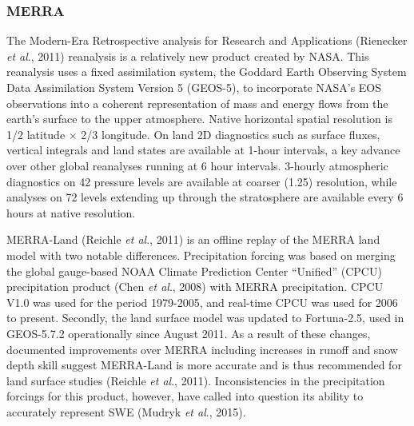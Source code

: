 \documentclass[12pt]{article}
\begin{document}
\subsubsection{MERRA}
The Modern-Era Retrospective analysis for Research and Applications (Rienecker \textit{et al}., 2011) reanalysis is a relatively new product created by NASA.  This reanalysis uses a fixed assimilation system, the Goddard Earth Observing System Data Assimilation System Version 5 (GEOS-5), to incorporate NASA's EOS observations into a coherent representation of mass and energy flows from the earth's surface to the upper atmosphere.  Native horizontal spatial resolution is 1/2\textdegree{} latitude $\times$ 2/3\textdegree{} longitude.  On land 2D diagnostics such as surface fluxes, vertical integrals and land states are available at 1-hour intervals, a key advance over other global reanalyses running at 6 hour intervals.  3-hourly atmospheric diagnostics on 42 pressure levels are available at coarser (1.25\textdegree) resolution, while analyses on 72 levels extending up through the stratosphere are available every 6 hours at native resolution.

MERRA-Land (Reichle \textit{et al}., 2011) is an offline replay of the MERRA land model with two notable differences.  Precipitation forcing was based on merging the global gauge-based NOAA Climate Prediction Center ``Unified'' (CPCU) precipitation product (Chen \textit{et al}., 2008) with MERRA precipitation.  CPCU V1.0 was used for the period 1979-2005, and real-time CPCU was used for 2006 to present.  Secondly, the land surface model was updated to Fortuna-2.5, used in GEOS-5.7.2 operationally since August 2011.  As a result of these changes, documented improvements over MERRA including increases in runoff and snow depth skill suggest MERRA-Land is more accurate and is thus recommended for land surface studies (Reichle \textit{et al}., 2011).  Inconsistencies in the precipitation forcings for this product, however, have called into question its ability to accurately represent SWE (Mudryk \textit{et al}., 2015).
\end{document}
